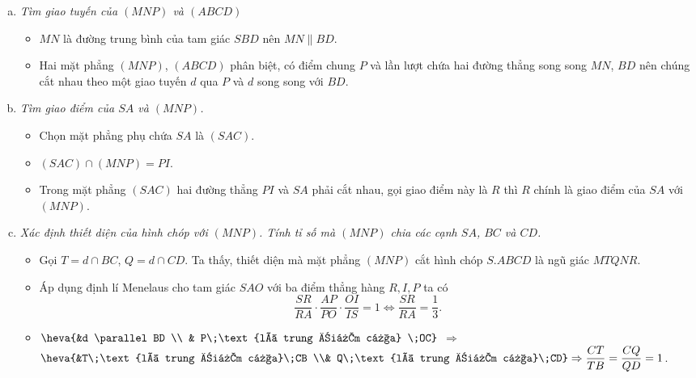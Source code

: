 \begin{bt}
\begin{bt}
{{}
		\begin{enumerate}[b)]
			\item[$*$] \textit{Tìm giao tuyến của  $(MNP)$ và $(ABCD)$}
			\begin{itemize}
				\item $MN$ là đường trung bình của tam giác $SBD$ nên $MN \parallel BD$.
				\item Hai mặt phẳng $(MNP)$, $(ABCD)$ phân biệt, có điểm chung $P$ và lần lượt chứa hai đường thẳng song song $MN$, $BD$ nên chúng cắt nhau theo một giao tuyến $d$ qua $P$ và $d$ song song với $BD$.
			\end{itemize}
			\item \textit{ Tìm giao điểm của $SA$ và $(MNP)$.}
			\begin{itemize}
				\item  Chọn mặt phẳng phụ chứa $SA$ là $(SAC)$.
				\item $(SAC)\cap (MNP)=PI$.
				\item Trong mặt phẳng $(SAC)$ hai đường thẳng $PI$ và $SA$ phải cắt nhau, gọi giao điểm này là $R$ thì $R$ chính là giao điểm của $SA$ với $(MNP)$.
			\end{itemize}
			\item[$\text{c})$]  \textit{Xác định thiết diện của hình chóp với $(MNP)$. Tính tỉ số mà $(MNP)$ chia các cạnh $SA$, $BC$ và $CD$.}
			\begin{itemize}
				\item  Gọi $T=d\cap BC$, $Q=d\cap CD$. Ta thấy, thiết diện mà mặt phẳng $(MNP)$ cắt hình chóp $S.ABCD$ là ngũ giác $MTQNR$.
				\item 	Áp dụng định lí Menelaus cho tam giác $SAO$ với ba điểm thẳng hàng $R, I, P$ ta có
				$$\dfrac{SR}{RA}\cdot\dfrac{AP}{PO}\cdot\dfrac{OI}{IS}=1\Leftrightarrow \dfrac{SR}{RA}=\dfrac{1}{3}.$$
				\item $\heva{&d \parallel BD \\
					& P\;\text{là trung điểm của} \;OC}$ $\Rightarrow$ $\heva{&T\;\text{là trung điểm của}\;CB \\& Q\;\text{là trung điểm của}\;CD}\Rightarrow \dfrac{CT}{TB}=\dfrac{CQ}{QD}=1$.

\end{itemize}
\end{enumerate}}
\end{bt}
\end{bt}
